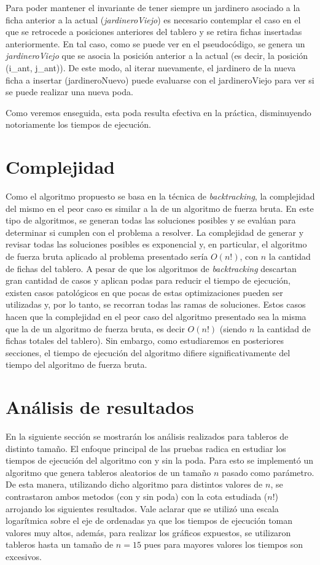 \documentclass[a4paper,10pt] {article}
\begin{document}
Para poder mantener el invariante de tener siempre un jardinero asociado a la ficha anterior a la actual (\textit{jardineroViejo}) es necesario contemplar el caso en el que se retrocede a posiciones anteriores del tablero y se retira fichas insertadas anteriormente. En tal caso, como se puede ver en el pseudoc\'odigo, se genera un \textit{jardineroViejo} que se asocia la posici\'on anterior a la actual (es decir, la posici\'on (i\_ant, j\_ant)). De este modo, al iterar nuevamente, el jardinero de la nueva ficha a insertar (jardineroNuevo) puede evaluarse con el jardineroViejo para ver si se puede realizar una nueva poda.

Como veremos enseguida, esta poda resulta efectiva en la pr\'actica, disminuyendo notoriamente los tiempos de ejecuci\'on.

\section*{Complejidad}

Como el algoritmo propuesto se basa en la t\'ecnica de \textit{backtracking}, la complejidad del mismo en el peor caso es similar a la de un algoritmo de fuerza bruta. En este tipo de algoritmos, se generan todas las soluciones posibles y se eval\'uan para determinar si cumplen con el problema a resolver. La complejidad de generar y revisar todas las soluciones posibles es exponencial y, en particular, el algoritmo de fuerza bruta aplicado al problema presentado ser\'ia $O(n!)$, con $n$ la cantidad de fichas del tablero. A pesar de que los algoritmos de \textit{backtracking} descartan gran cantidad de casos y aplican podas para reducir el tiempo de ejecuci\'on, existen casos patol\'ogicos en que pocas de estas optimizaciones pueden ser utilizadas y, por lo tanto, se recorran todas las ramas de soluciones. Estos casos hacen que la complejidad en el peor caso del algoritmo presentado sea la misma que la de un algoritmo de fuerza bruta, es decir $O(n!)$ (siendo $n$ la cantidad de fichas totales del tablero). Sin embargo, como estudiaremos en posteriores secciones, el tiempo de ejecuci\'on del algoritmo difiere significativamente del tiempo del algoritmo de fuerza bruta.

\section*{An\'alisis de resultados}

En la siguiente secci\'on se mostrar\'an los an\'alisis realizados para tableros de distinto tama\~{n}o. El enfoque principal de las pruebas radica en estudiar los tiempos de ejecuci\'on del algoritmo con y sin la poda. Para esto se implement\'o un algoritmo que genera tableros aleatorios de un tama\~{n}o $n$ pasado como par\'ametro. De esta manera, utilizando dicho algoritmo para distintos valores de $n$, se contrastaron ambos metodos (con y sin poda) con la cota estudiada ($n!$) arrojando los siguientes resultados. Vale aclarar que se utiliz\'o una escala logar\'itmica sobre el eje de ordenadas ya que los tiempos de ejecuci\'on toman valores muy altos, adem\'as, para realizar los gr\'aficos expuestos, se utilizaron tableros hasta un tama\~{n}o de $n=15$ pues para mayores valores los tiempos son excesivos.
\end{document}

